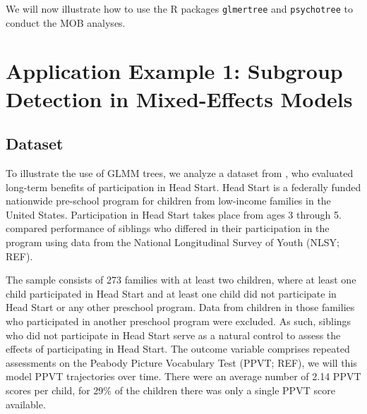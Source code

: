 \documentclass[doc,floatsintext,natbib]{apa7}
\begin{document}
We will now illustrate how to use the R packages \texttt{glmertree} and \texttt{psychotree} to conduct the MOB analyses. 




\newpage
\section{Application Example 1: Subgroup Detection in Mixed-Effects Models}
\label{sec:TutorialMixed}



\subsection{Dataset}

To illustrate the use of GLMM trees, we analyze a dataset from \cite{Demi09}, who evaluated long-term benefits of participation in Head Start. Head Start is a federally funded nationwide pre-school program for children from low-income families in the United States. Participation in Head Start takes place from ages 3 through 5. \cite{Demi09} compared performance of siblings who differed in their participation in the program using data from the National Longitudinal Survey of Youth (NLSY; REF). 

The sample consists of 273 families with at least two children, where at least one child participated in Head Start and at least one child did not participate in Head Start or any other preschool program. Data from children in those families who participated in another preschool program were excluded. As such, siblings who did not participate in Head Start serve as a natural control to assess the effects of participating in Head Start. The outcome variable comprises repeated assessments on the Peabody Picture Vocabulary Test (PPVT; REF), we will this model PPVT trajectories over time. There were an average number of 2.14 PPVT scores per child, for 29\% of the children there was only a single PPVT score available. 

\end{document}
